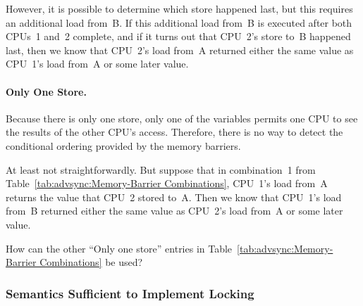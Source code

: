 	However, it is possible to determine which store happened
	last, but this requires an additional load from~B.
	If this additional load from~B is executed after both
	CPUs~1 and~2 complete, and if it turns out that CPU~2's
	store to~B happened last, then we know
	that CPU~2's load from~A returned either the same value
	as CPU~1's load from~A or some later value.

\paragraph{Only One Store.}
	Because there is only one store, only one of the variables
	permits one CPU to see the results of the other CPU's
	access.
	Therefore, there is no way to detect the
	conditional ordering provided by the memory barriers.

	At least not straightforwardly.
	But suppose that in combination~1 from
	Table~\ref{tab:advsync:Memory-Barrier Combinations},
	CPU~1's load from~A returns the value that CPU~2 stored
	to~A.  Then we know that CPU~1's load from~B returned
	either the same value as CPU~2's load from~A or some later value.

\QuickQuiz{}
	How can the other ``Only one store'' entries in
	Table~\ref{tab:advsync:Memory-Barrier Combinations}
	be used?
 \QuickQuizEnd

\subsubsection{Semantics Sufficient to Implement Locking}

